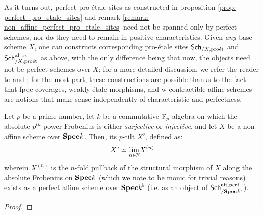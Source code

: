                 \begin{remark} \label{remark: non_perfect_pro_etale_sites}
                    As it turns out, perfect pro-\'etale sites as constructed in proposition \ref{prop: perfect_pro_etale_sites} and remark \ref{remark: non_affine_perfect_pro_etale_sites} need not be spanned only by perfect schemes, nor do they need to remain in positive characteristics. Given \textit{any} base scheme $X$, one can constructs corresponding pro-\'etale sites $\mathsf{Sch}_{/X, \mathrm{pro\acute{e}t}}$ and $\mathsf{Sch}^{\mathrm{aff}, w}_{/X, \mathrm{pro\acute{e}t}}$ as above, with the only difference being that now, the objects need not be perfect schemes over $X$; for a more detailed discussion, we refer the reader to \cite[Section 4]{bhatt_scholze_2014_pro_etale} and \cite[\href{https://stacks.math.columbia.edu/tag/0988}{Tag 0988}]{stacks}; for the most part, these constructions are possible thanks to the fact that fpqc coverages, weakly \'etale morphisms, and w-contractible affine schemes are notions that make sense independently of characteristic and perfectness. 
                \end{remark}
                
                \begin{proposition} \label{prop: tilting_non_affine_schemes}
                    Let $p$ be a prime number, let $k$ be a commutative $\mathbb{F}_p$-algebra on which the absolute $p^{th}$ power Frobenius is either \textit{surjective} or \textit{injective}, and let $X$ be a non-affine scheme over $\mathbf{Spec} k$. Then, its $p$-tilt $X^{\flat}$, defined as:
                        $$X^{\flat} \simeq \underset{n \in \mathbb{N}}{\operatorname{lim}} X^{(n)}$$
                    wherein $X^{(n)}$ is the $n$-fold pullback of the structural morphism of $X$ along the absolute Frobenius on $\mathbf{Spec} k$ (which we note to be monic for trivial reasons) exists as a perfect affine scheme over $\mathbf{Spec} k^{\flat}$ (i.e. as an object of $\mathsf{Sch}^{\mathrm{aff}, \mathrm{perf}}_{/\mathbf{Spec} k^{\flat}}$).  
                \end{proposition}
                    \begin{proof}
                        
                    \end{proof}
                \begin{corollary}
                    
                \end{corollary}
                
